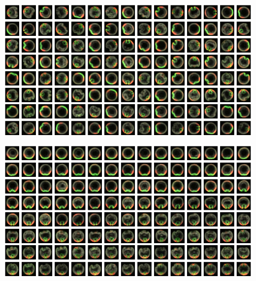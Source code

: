 \documentclass[12pt]{minimal}
\begin{document}
\noindent
{}
\includegraphics{fixed_images_unregistered_unordered}
\vspace{0.5cm}

\noindent
{}\includegraphics{fixed_images_registered_ordered}
\end{document}
